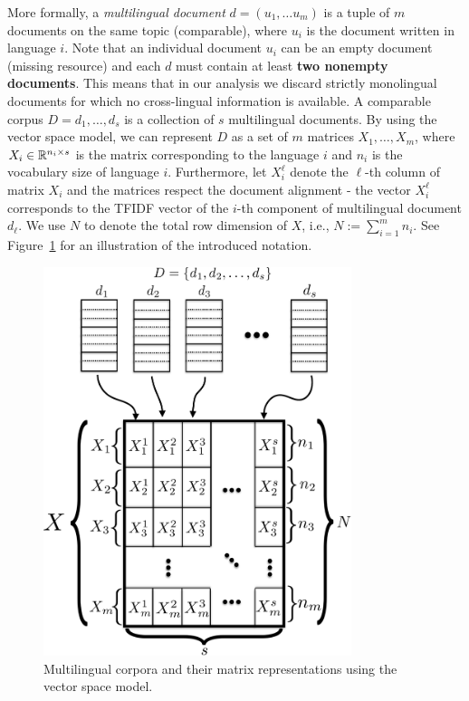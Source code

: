 More formally, a \emph{multilingual document} $d = (u_1,\ldots u_m)$ is a tuple of $m$ documents 
on the same topic (comparable), where $u_i$ is the document written in language $i$. Note that 
an individual document $u_i$ can be an empty document (missing resource) and each $d$ must contain 
at least \textbf{two nonempty documents}. This means that in our analysis we discard strictly 
monolingual documents for which no cross-lingual information is available. A comparable corpus 
$D = {d_1, \ldots, d_s}$ is a collection of $s$ multilingual documents. By using the vector space 
model, we can represent $D$ as a set of $m$ matrices $X_1,\ldots,X_m$, where $X_i \in \mathbb{R}^{n_i \times s}$ 
is the matrix corresponding to the language $i$ and $n_i$ is the vocabulary size of language $i$. 
Furthermore, let $X_i^{\ell}$ denote the $\ell$-th column of matrix $X_i$ and the matrices respect 
the document alignment - the vector $X_i^\ell$ corresponds to the TFIDF vector of the $i$-th component 
of multilingual document $d_\ell$. We use $N$ to denote the total row dimension of $X$, i.e., 
$N:= \sum_{i=1}^m n_i$. See Figure~\ref{fig:stacked_matrices} for an illustration of the introduced notation.

\begin{figure}[tbp]
\centering
\includegraphics[width=9cm]{figures/stacked_matrices1-crop.pdf}
\caption{\label{fig:stacked_matrices} Multilingual corpora and their matrix representations using the vector space model.}
\end{figure}

